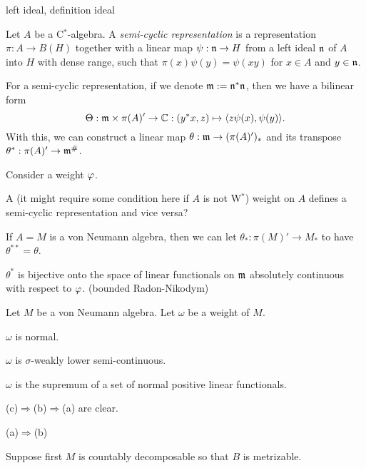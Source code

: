 \documentclass{../../large}
\begin{document}
\begin{prb}
left ideal, definition ideal
\end{prb}


\begin{prb}
Let $A$ be a C$^*$-algebra.
A \emph{semi-cyclic representation} is a representation $\pi:A\to B(H)$ together with a linear map $\psi:\mathfrak{n}\to H$ from a left ideal $\mathfrak{n}$ of $A$ into $H$ with dense range, such that $\pi(x)\psi(y)=\psi(xy)$ for $x\in A$ and $y\in\mathfrak{n}$.

For a semi-cyclic representation, if we denote $\mathfrak{m}:=\mathfrak{n}^*\mathfrak{n}$, then we have a bilinear form
\[\Theta:\mathfrak{m}\times\pi(A)'\to\mathbb{C}:(y^*x,z)\mapsto\langle z\psi(x),\psi(y)\rangle.\]
With this, we can construct a linear map $\theta:\mathfrak{m}\to(\pi(A)')_*$ and its transpose $\theta^*:\pi(A)'\to\mathfrak{m}^\#$.

Consider a weight $\varphi$.
\begin{parts}
\item A (it might require some condition here if $A$ is not W$^*$) weight on $A$ defines a semi-cyclic representation and vice versa?
\item If $A=M$ is a von Neumann algebra, then we can let $\theta_*:\pi(M)'\to M_*$ to have $\theta^{**}=\theta$.
\item $\theta^*$ is bijective onto the space of linear functionals on $\mathfrak{m}$ absolutely continuous with respect to $\varphi$. (bounded Radon-Nikodym)
\end{parts}
\end{prb}



\begin{prb}
Let $M$ be a von Neumann algebra.
Let $\omega$ be a weight of $M$.
\begin{parts}
\item $\omega$ is normal.
\item $\omega$ is $\sigma$-weakly lower semi-continuous.
\item $\omega$ is the supremum of a set of normal positive linear functionals.
\end{parts}
\end{prb}
\begin{pf}
(c)$\Rightarrow$(b)$\Rightarrow$(a) are clear.

(a)$\Rightarrow$(b)


Suppose first $M$ is countably decomposable so that $B$ is metrizable.


\end{pf}
\end{document}
